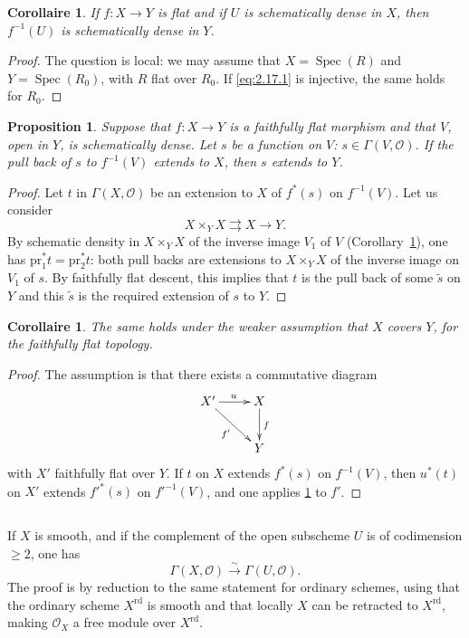 \documentclass[11pt,a4paper]{article}
\theoremstyle{plain}
\newtheorem{proposition}[theorem]{Proposition}
\newtheorem{corollary}[theorem]{Corollaire}
\theoremstyle{definition}
\DeclareMathOperator{\Spec}{Spec}
\newcommand{\simto}{\xrightarrow{\sim}}
\begin{document}
\begin{corollary}\label{cor:2.18}
If $f : X \to Y$ is flat and if $U$ is schematically dense in $X$, then $f^{-1}(U)$ is schematically dense in $Y$.
\end{corollary}

\begin{proof}
The question is local: we may assume that $X = \Spec(R)$ and $Y = \Spec(R_0)$, with $R$ flat over $R_0$. If \eqref{eq:2.17.1} is injective, the same holds for $R_0$.
\end{proof}

\begin{proposition}\label{prop:2.19}
Suppose that $f : X \to Y$ is a faithfully flat morphism and that $V$, open in $Y$, is schematically dense. Let $s$ be a function on $V$: $s \in \Gamma(V, \mathcal{O})$. If the pull back of $s$ to $f^{-1}(V)$ extends to $X$, then $s$ extends to $Y$.
\end{proposition}

\begin{proof}
Let $t$ in $\Gamma(X, \mathcal{O})$ be an extension to $X$ of $f^*(s)$ on $f^{-1}(V)$. Let us consider
\[
X \times_Y X \rightrightarrows X \to Y.
\]
By schematic density in $X \times_Y X$ of the inverse image $V_1$ of $V$ (Corollary~\ref{cor:2.18}), one has $\mathrm{pr}_1^* t = \mathrm{pr}_2^* t$: both pull backs are extensions to $X \times_Y X$ of the inverse image on $V_1$ of $s$. By faithfully flat descent, this implies that $t$ is the pull back of some $\tilde{s}$ on $Y$ and this $\tilde{s}$ is the required extension of $s$ to $Y$.
\end{proof}

\begin{corollary}\label{cor:2.20}
The same holds under the weaker assumption that $X$ covers $Y$, for the faithfully flat topology.
\end{corollary}

\begin{proof}
The assumption is that there exists a commutative diagram
\[
\xymatrix{
X' \ar[r]^{u} \ar[rd]_{f'} & X \ar[d]^{f} \\
& Y
}
\]
with $X'$ faithfully flat over $Y$. If $t$ on $X$ extends $f^*(s)$ on $f^{-1}(V)$, then $u^*(t)$ on $X'$ extends $f'^*(s)$ on $f'^{-1}(V)$, and one applies \ref{prop:2.19} to $f'$.
\end{proof}

\subsection{}
\label{sec:2.21}
If $X$ is smooth, and if the complement of the open subscheme $U$ is of codimension $\geq 2$, one has
\[
\Gamma(X, \mathcal{O}) \simto \Gamma(U, \mathcal{O}).
\]
The proof is by reduction to the same statement for ordinary schemes, using that the ordinary scheme $X^{\mathrm{rd}}$ is smooth and that locally $X$ can be retracted to $X^{\mathrm{rd}}$, making $\mathcal{O}_X$ a free module over $X^{\mathrm{rd}}$.
\end{document}
